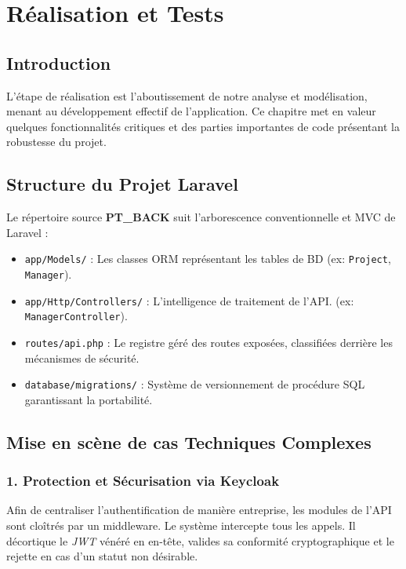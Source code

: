 \chapter{R\'{e}alisation et Tests}

\section{Introduction}
L'\'{e}tape de r\'{e}alisation est l'aboutissement de notre analyse et mod\'{e}lisation,
menant au d\'{e}veloppement effectif de l'application. Ce chapitre met en valeur
quelques fonctionnalit\'{e}s critiques et des parties importantes de code
pr\'{e}sentant la robustesse du projet.

\section{Structure du Projet Laravel}
Le r\'{e}pertoire source \textbf{PT\_BACK} suit l'arborescence conventionnelle et MVC de Laravel :
\begin{itemize}[leftmargin=*]
    \item \texttt{app/Models/} : Les classes ORM repr\'{e}sentant les tables de BD (ex: \texttt{Project}, \texttt{Manager}).
    \item \texttt{app/Http/Controllers/} : L'intelligence de traitement de l'API. (ex: \texttt{ManagerController}).
    \item \texttt{routes/api.php} : Le registre g\'{e}r\'{e} des routes expos\'{e}es, classifi\'{e}es
    derri\`{e}re les m\'{e}canismes de s\'{e}curit\'{e}.
    \item \texttt{database/migrations/} : Syst\`{e}me de versionnement de proc\'{e}dure SQL garantissant la portabilit\'{e}.
\end{itemize}

\section{Mise en sc\`{e}ne de cas Techniques Complexes}

\subsection{1. Protection et S\'{e}curisation via Keycloak}
Afin de centraliser l'authentification de mani\`{e}re entreprise, les modules de l'API
sont clo\^{i}tr\'{e}s par un middleware. Le syst\`{e}me intercepte tous les appels. Il d\'{e}cortique le
\textit{JWT} v\'{e}n\'{e}r\'{e} en en-t\^{e}te, valides sa conformit\'{e} cryptographique et le rejette en cas d'un statut non d\'{e}sirable.

